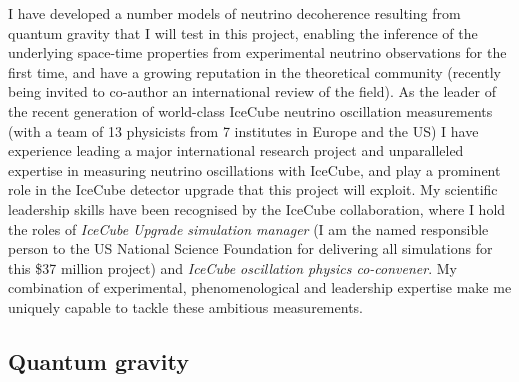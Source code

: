 \documentclass[a4paper,11pt]{article}
\begin{document}

I have developed a number models of neutrino decoherence resulting from quantum gravity that I will test in this project, enabling the inference of the underlying space-time properties from experimental neutrino observations for the first time, and have a growing reputation in the theoretical community (recently being invited to co-author an international review of the field). As the leader of the recent generation of world-class IceCube neutrino oscillation measurements (with a team of 13 physicists from 7 institutes in Europe and the US) I have experience leading a major international research project and unparalleled expertise in measuring neutrino oscillations with IceCube, and play a prominent role in the IceCube detector upgrade that this project will exploit. My scientific leadership skills have been recognised by the IceCube collaboration, where I hold the roles of \textit{IceCube Upgrade simulation manager} (I am the named responsible person to the US National Science Foundation for delivering all simulations for this \$37 million project) and \textit{IceCube oscillation physics co-convener}. My combination of experimental, phenomenological and leadership expertise make me uniquely capable to tackle these ambitious measurements. \\


\subsection{Quantum gravity}


\end{document}
